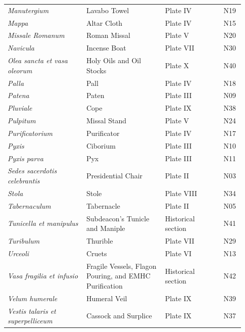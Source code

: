 {\begin{longtable}{>{\raggedright\arraybackslash}p{0.31\linewidth}>{\raggedright\arraybackslash}p{0.31\linewidth}>{\raggedright\arraybackslash}p{0.23\linewidth}>{\raggedright\arraybackslash}p{0.08\linewidth}}
\textit{Manutergium} & Lavabo Towel & Plate IV & N19 \\
\textit{Mappa} & Altar Cloth & Plate IV & N15 \\
\textit{Missale Romanum} & Roman Missal & Plate V & N20 \\
\textit{Navicula} & Incense Boat & Plate VII & N30 \\
\textit{Olea sancta et vasa oleorum} & Holy Oils and Oil Stocks & Plate X & N40 \\
\textit{Palla} & Pall & Plate IV & N18 \\
\textit{Patena} & Paten & Plate III & N09 \\
\textit{Pluviale} & Cope & Plate IX & N38 \\
\textit{Pulpitum} & Missal Stand & Plate V & N24 \\
\textit{Purificatorium} & Purificator & Plate IV & N17 \\
\textit{Pyxis} & Ciborium & Plate III & N10 \\
\textit{Pyxis parva} & Pyx & Plate III & N11 \\
\textit{Sedes sacerdotis celebrantis} & Presidential Chair & Plate II & N03 \\
\textit{Stola} & Stole & Plate VIII & N34 \\
\textit{Tabernaculum} & Tabernacle & Plate II & N05 \\
\textit{Tunicella et manipulus} & Subdeacon's Tunicle and Maniple & Historical section & N41 \\
\textit{Turibulum} & Thurible & Plate VII & N29 \\
\textit{Urceoli} & Cruets & Plate VI & N13 \\
\textit{Vasa fragilia et infusio} & Fragile Vessels, Flagon Pouring, and EMHC Purification & Historical section & N42 \\
\textit{Velum humerale} & Humeral Veil & Plate IX & N39 \\
\textit{Vestis talaris et superpelliceum} & Cassock and Surplice & Plate IX & N37 \\
\bottomrule
\end{longtable}}
